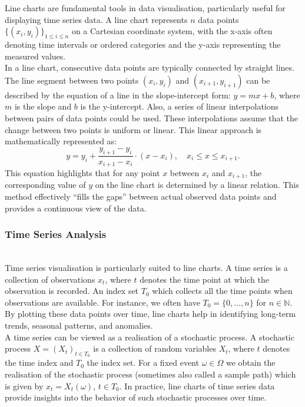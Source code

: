 \documentclass{article}\usepackage[]{graphicx}\usepackage[]{xcolor}
\numberwithin{equation}{section}
\begin{document}
\noindent
Line charts are fundamental tools in data visualisation, particularly useful for displaying time series data. A line chart represents $n$ data points 
$\{(x_i,y_i)\}_{1 \leq i \leq n}$ on a Cartesian coordinate system, with the x-axis often denoting time intervals or ordered categories and the y-axis representing the measured values.\\ 

\noindent
In a line chart, consecutive data points are typically connected by straight lines. The line segment between two points \((x_i,y_i)\) and \((x_{i+1},y_{i+1})\) can be described by the equation of a line in the slope-intercept form: \(y=mx+b\), where \(m\) is the slope and \(b\) is the y-intercept. Also, a series of linear interpolations between pairs of data points could be used. These interpolations assume that the change between two points is uniform or linear. This linear approach is mathematically represented as:
\[
y = y_i + \frac{y_{i+1} - y_i}{x_{i+1} - x_i} \cdot (x - x_i), \quad  x_i \leq x \leq x_{i+1}.
\]
\noindent
This equation highlights that for any point \(x\) between \(x_i\) and \(x_{i+1}\), the corresponding value of \(y\) on the line chart is determined by a linear relation. This method effectively ``fills the gaps'' between actual observed data points and provides a continuous view of the data.

\subsubsection{Time Series Analysis}\\
\noindent
Time series visualisation is particularly suited to line charts. A time series is a collection of observations $x_t$, where $t$ denotes the time point at which the observation is recorded. An index set $T_0$ which collects all the time points when observations are available. For instance, we often have $T_0 = \{0,\dots ,n\}$ for $n \in \mathbb{N}$. By plotting these data points over time, line charts help in identifying long-term trends, seasonal patterns, and anomalies.\\

\noindent
A time series can be viewed as a realisation of a stochastic process. A stochastic process \cite{Brockwell2016Introduction} $X = (X_t)_{t \in T_0}$ is a collection of random variables $X_t$, where $t$ denotes the time index and $T_0$ the index set. For a fixed event $\omega \in \Omega$ we obtain the realisation of the stochastic process (sometimes also called a sample path) which is given by $x_t = X_t(\omega)$, $t \in T_0$. In practice, line charts of time series data provide insights into the behavior of such stochastic processes over time.\\
\end{document}
